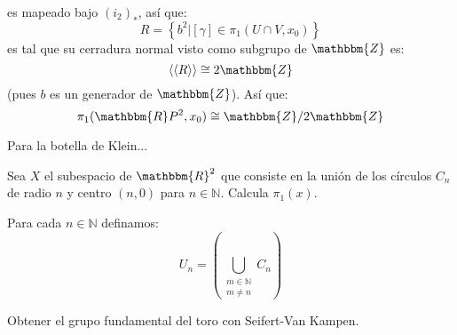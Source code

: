 \documentclass[12pt]{report}
\theoremstyle{largebreak}
\newcommand{\bbm}[1]{\ensuremath{\mathbbm{#1}}}
\newcommand{\gen}[1]{\ensuremath{\langle#1\rangle}}
\begin{document}
\begin{sol}
        es mapeado bajo $(i_2)_*$, así que:
        \begin{equation*}
            R=\left\{b^2\Big|[\gamma]\in\pi_1(U\cap V,x_0) \right\}
        \end{equation*}
        es tal que su cerradura normal visto como subgrupo de $\bbm{Z}$ es:
        \begin{equation*}
            \gen{\gen{R}}\cong 2\bbm{Z}
        \end{equation*}
        (pues $b$ es un generador de $\bbm{Z}$). Así que:
        \begin{equation*}
            \pi_1(\bbm{R}P^2,x_0)\cong\bbm{Z}/2\bbm{Z}
        \end{equation*}

        Para la botella de Klein...
    \end{sol}

    \begin{excer}
        Sea $X$ el subespacio de $\bbm{R}^2$ que consiste en la unión de los círculos $C_n$ de radio $n$ y centro $(n,0)$ para $n\in\mathbb{N}$. Calcula $\pi_1(x)$.
    \end{excer}

    \begin{sol}
        Para cada $n\in\mathbb{N}$ definamos:
        \begin{equation*}
            U_n=\left(\bigcup_{\substack{m\in\mathbb{N} \\ m\neq n}}C_n\right)
        \end{equation*}
    \end{sol}

    \begin{excer}
        Obtener el grupo fundamental del toro con Seifert-Van Kampen.
    \end{excer}
\end{document}
